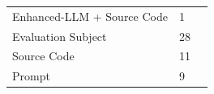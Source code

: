 \begin{tabular} { p{} p{} p{} }
Enhanced-LLM + Source Code & 1 & \cite{ \paperthirtythird }\\ 
Evaluation Subject & 28 & \cite{ \paperfourth,\papersixth,\papertenth,\paperfiftythird,\papersixtieth,\paperseventythird,\paperseventyeighth,\papereightysixth,\papereightyninth,\paperninetyfifth,\paperninetysixth,\paperonehundredthird,\paperonehundredseventh,\paperonehundredtwelfth,\paperonehundredtwentyfifth,\paperonehundredthirtyfirst,\paperonehundredthirtythird,\paperonehundredthirtyeighth,\paperonehundredfortyfourth,\paperonehundredfiftythird,\paperonehundredfiftysixth,\paperonehundredsixtythird,\paperonehundredninetythird,\paperonehundredninetyeighth,\papertwohundredthird,\papertwohundredtwentythird,\papertwohundredthirtyseventh,\papertwohundredfiftythird }\\ 
Source Code & 11 & \cite{ \papertwentyeighth,\papersixtythird,\papersixtyfifth,\paperonehundredtwentyfirst,\paperonehundredtwentysixth,\paperonehundredsixtieth,\paperonehundredseventieth,\papertwohundredthirteenth,\papertwohundredtwentyfirst,\papertwohundredtwentyseventh,\papertwohundredfiftyfirst }\\ 
Prompt & 9 & \cite{ \papertwentythird,\paperfortyfourth,\paperninetyeighth,\paperonehundredfirst,\paperonehundredfiftyfirst,\paperonehundredseventyseventh,\papertwohundredfifth,\papertwohundredtenth,\papertwohundredthirtyfourth }\\ 
\bottomrule 
\end{tabular} 
